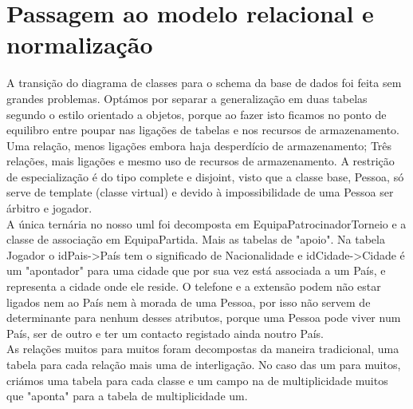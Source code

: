\documentclass[a4paper]{article}
\begin{document}
\section{Passagem ao modelo relacional e normalização}
A transição do diagrama de classes para o schema da base de dados foi feita sem grandes problemas. Optámos por separar a generalização em duas tabelas segundo o estilo orientado a objetos, porque ao fazer isto ficamos no ponto de equilibro entre poupar nas ligações de tabelas e nos recursos de armazenamento. Uma relação, menos ligações embora haja desperdício de armazenamento; Três relações, mais ligações e mesmo uso de recursos de armazenamento. A restrição de especialização é do tipo complete e disjoint, visto que a classe base, Pessoa, só serve de template (classe virtual) e devido à impossibilidade de uma Pessoa ser árbitro e jogador.
\\\newline
A única ternária no nosso uml foi decomposta em EquipaPatrocinadorTorneio e a classe de associação em EquipaPartida. Mais as tabelas de "apoio". Na tabela Jogador o idPais->País tem o significado de Nacionalidade e idCidade->Cidade é um "apontador" para uma cidade que por sua vez está associada a um País, e representa a cidade onde ele reside. O telefone e a extensão podem não estar ligados nem ao País nem à morada de uma Pessoa, por isso não servem de determinante para nenhum desses atributos, porque uma Pessoa pode viver num País, ser de outro e ter um contacto registado ainda noutro País.
\\\newline
As relações muitos para muitos foram decompostas da maneira tradicional, uma tabela para cada relação mais uma de interligação. No caso das um para muitos, criámos uma tabela para cada classe e um campo na de multiplicidade muitos que "aponta" para a tabela de multiplicidade um.
\clearpage
\end{document}
